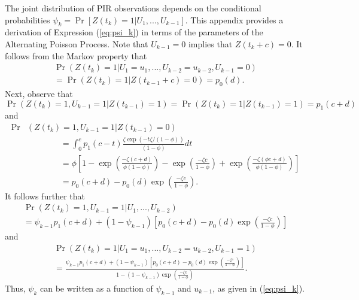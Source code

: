 \documentclass[man, noextraspace, floatsintext]{apa6}\usepackage[]{graphicx}\usepackage[]{color}
\begin{document}
The joint distribution of PIR observations depends on the conditional probabilities $\psi_k = \Pr\left[ Z(t_k) = 1 \left| U_1,...,U_{k-1}\right.\right]$. This appendix provides a derivation of Expression (\ref{eq:psi_k}) in terms of the parameters of the Alternating Poisson Process. Note that $U_{k-1} = 0$ implies that $Z(t_k + c) = 0$. It follows from the Markov property that 
\begin{multline*}
\Pr\left(Z(t_k) = 1 \left| U_1 = u_1,...,U_{k-2} = u_{k-2}, U_{k-1} = 0 \right.\right) \\ 
= \Pr\left(Z(t_k) = 1 \left| Z(t_{k-1} + c) = 0 \right.\right) = p_0(d).
\end{multline*}
Next, observe that \[
\Pr\left(Z(t_k) = 1, U_{k-1} = 1 \left| Z(t_{k-1}) = 1 \right.\right) = \Pr\left(Z(t_k) = 1 \left| Z(t_{k-1}) = 1 \right.\right) = p_1(c + d) \]
and \begin{align*}
\Pr &\left(Z(t_k) = 1, U_{k-1} = 1 \left| Z(t_{k-1}) = 0 \right.\right) \\
& \qquad \qquad = \int_0^c p_1(c - t) \frac{ \zeta \exp(-t \zeta / (1 - \phi))}{(1 - \phi)} dt \\
& \qquad \qquad  = \phi \left[ 1 - \exp\left(\frac{- \zeta (c + d)}{\phi(1 - \phi)}\right) - \exp\left(\frac{- \zeta c}{1 - \phi}\right) + \exp\left(\frac{- \zeta (\phi c + d)}{\phi(1 - \phi)}\right)\right] \\
& \qquad \qquad = p_0(c + d) - p_0(d) \exp\left(\frac{- \zeta c}{1 - \phi}\right).
\end{align*}
It follows further that \begin{multline*}
\Pr\left(Z(t_k) = 1, U_{k-1} = 1 \left| U_1,...,U_{k-2} \right.\right) \\
= \psi_{k-1} p_1(c + d) + (1 - \psi_{k-1}) \left[p_0(c + d) - p_0(d) \exp\left(\frac{- \zeta c}{1 - \phi}\right)\right]
\end{multline*}
and
\begin{multline*}
\Pr\left(Z(t_k) = 1 \left| U_1 = u_1,...,U_{k-2} = u_{k-2}, U_{k-1} = 1 \right.\right) \\
= \frac{\psi_{k-1} p_1(c + d) + (1 - \psi_{k-1}) \left[p_0(c + d) - p_0(d) \exp\left(\frac{- \zeta c}{1 - \phi}\right)\right]}{1 - (1 - \psi_{k-1})\exp\left( \frac{-\zeta c}{1 - \phi}\right)}.
\end{multline*}
Thus, $\psi_k$ can be written as a function of $\psi_{k-1}$ and $u_{k-1}$, as given in (\ref{eq:psi_k}).
\end{document}
